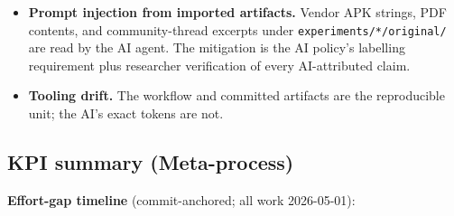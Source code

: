 \documentclass[11pt,a4paper]{article}
\begin{document}
\begin{itemize}
        ship them with a caveat), and the upstream
         and
         repositories cloned
        into \texttt{experiments/*/original/} each require their own
        equivalent pass against the same catalogue before public
        release.
  \item \textbf{Prompt injection from imported artifacts.} Vendor APK
        strings, PDF contents, and community-thread excerpts under
        \texttt{experiments/*/original/} are read by the AI agent. The
        mitigation is the AI policy's labelling requirement plus
        researcher verification of every AI-attributed claim.
  \item \textbf{Tooling drift.} The workflow and committed artifacts are
        the reproducible unit; the AI's exact tokens are not.
\end{itemize}

\subsection{KPI summary (Meta-process)}
\label{sec:meta-kpis}

\textbf{Effort-gap timeline} (commit-anchored; all work 2026-05-01):
\end{document}
